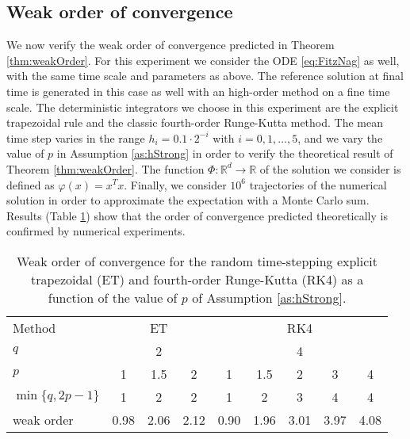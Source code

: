 \documentclass{siamart1116}
\numberwithin{theorem}{section}
\renewcommand{\phi}{\varphi}
\newcommand{\R}{\mathbb{R}}
\begin{document}
\subsection{Weak order of convergence}
We now verify the weak order of convergence predicted in Theorem \ref{thm:weakOrder}. For this experiment we consider the ODE \eqref{eq:FitzNag} as well, with the same time scale and parameters as above. The reference solution at final time is generated in this case as well with an high-order method on a fine time scale. The deterministic integrators we choose in this experiment are the explicit trapezoidal rule and the classic fourth-order Runge-Kutta method. The mean time step varies in the range $h_i = 0.1\cdot 2^{-i}$ with $i = 0, 1, \ldots, 5$, and we vary the value of $p$ in Assumption \ref{as:hStrong} in order to verify the theoretical result of Theorem \ref{thm:weakOrder}. The function $\Phi\colon\R^d\to\R$ of the solution we consider is defined as $\phi(x) = x^Tx$. Finally, we consider $10^6$ trajectories of the numerical solution in order to approximate the expectation with a Monte Carlo sum. Results (Table \ref{tab:NumericalResultsWeakOrder}) show that the order of convergence predicted theoretically is confirmed by numerical experiments. 

\begin{table}[t]
	\centering
	\begin{tabular}{lcccccccc}
		\toprule
		Method & \multicolumn{3}{c}{ET} & \multicolumn{5}{c}{RK4} \\ 
		\cmidrule(l{2pt}r{2pt}){2-4} \cmidrule(l{2pt}r{2pt}){5-9} 
		$q$ & \multicolumn{3}{c}{2} & \multicolumn{5}{c}{4} \\
		$p$ & 1 & 1.5 & 2 & 1 & 1.5 & 2 & 3 & 4\\
		$\min\{q, 2p - 1\}$ & 1 & 2 & 2 & 1 & 2 & 3 & 4 & 4 \\
		weak order & 0.98 & 2.06 & 2.12 & 0.90 & 1.96 & 3.01 & 3.97 & 4.08 \\
		\bottomrule
	\end{tabular}
	\caption{Weak order of convergence for the random time-stepping explicit trapezoidal (ET) and fourth-order Runge-Kutta (RK4) as a function of the value of $p$ of Assumption \ref{as:hStrong}.}
	\label{tab:NumericalResultsWeakOrder}
\end{table}
\end{document}
